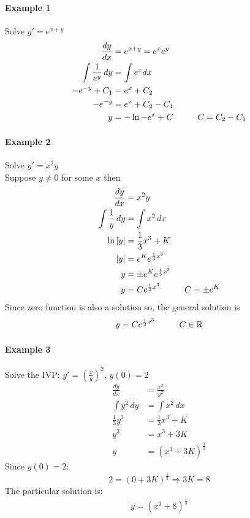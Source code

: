 \documentclass[12pt]{article}
\newcommand\tab[1][1cm]{\hspace*{#1}}
\begin{document}
\paragraph{Example 1} Solve $y' = e^{x + y}$
\begin{align*} 
    \frac{dy}{dx} &= e^{x + y} = e^x e^y \\
    \int \frac{1}{e^y} \, dy &= \int e^x dx \\
    - e^{ - y} + C_1 &= e^x + C_2 \\
    - e^{-y} &= e^x + C_2 - C_1 \\
    y &= - \ln{- e^x + C} \textrm{\tab} C = C_2 - C_1
\end{align*}

\paragraph{Example 2} Solve $y' = x^2y$ \\
Suppose $y \neq 0$ for some $x$ then 
\begin{align*} 
    \frac{dy}{dx} &= x^2y \\
    \int \frac{1}{y} \, dy &= \int x^2 \, dx \\
    \ln |y|& = \frac{1}{3} x^3 + K \\
    |y| &= e^Ke^{\frac{1}{3}x^3} \\
    y &= \pm e^Ke^{\frac{1}{3}x^3} \\
    y &= Ce^{\frac{1}{3}x^3} \textrm{\tab} C = \pm e^K
\end{align*}
Since zero function is also a solution so, the general solution is 
\[
    y = Ce^{\frac{1}{3}x^3} \textrm{\tab} C \in \mathbb{R}
\]

\paragraph{Example 3} Solve the IVP: $y' = \left( \frac{x}{y} \right)^2$, $y(0) = 2$ \\
\begin{align*} 
    \frac{dy}{dx} &= \frac{x^2}{y^2} \\
    \int y^2 \, dy &= \int x^2 \, dx \\
    \frac{1}{3} y^3 &= \frac{1}{3}x^3 + K \\
    y^3 &= x^3 + 3K \\
    y &= (x^3 + 3K)^{\frac{1}{3}}
\end{align*}
Since $y(0) = 2$:
\[
    2 = (0 + 3K)^\frac{1}{3} \Rightarrow 3K = 8
\]
The particular solution is:
\[
    y = (x^3 + 8)^{\frac{1}{3}}
\]
\end{document}

